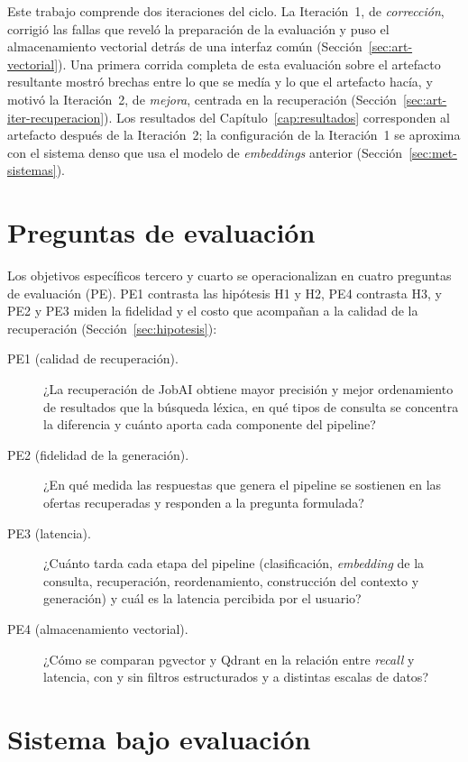 Este trabajo comprende dos iteraciones del ciclo. La Iteración~1, de \emph{corrección}, corrigió las fallas que reveló la preparación de la evaluación y puso el almacenamiento vectorial detrás de una interfaz común (Sección~\ref{sec:art-vectorial}). Una primera corrida completa de esta evaluación sobre el artefacto resultante mostró brechas entre lo que se medía y lo que el artefacto hacía, y motivó la Iteración~2, de \emph{mejora}, centrada en la recuperación (Sección~\ref{sec:art-iter-recuperacion}). Los resultados del Capítulo~\ref{cap:resultados} corresponden al artefacto después de la Iteración~2; la configuración de la Iteración~1 se aproxima con el sistema denso que usa el modelo de \textit{embeddings} anterior (Sección~\ref{sec:met-sistemas}).

\section{Preguntas de evaluación}
\label{sec:met-preguntas}

Los objetivos específicos tercero y cuarto se operacionalizan en cuatro preguntas de evaluación (PE). PE1 contrasta las hipótesis H1 y H2, PE4 contrasta H3, y PE2 y PE3 miden la fidelidad y el costo que acompañan a la calidad de la recuperación (Sección~\ref{sec:hipotesis}):

\begin{description}
    \item[PE1 (calidad de recuperación).] ¿La recuperación de JobAI obtiene mayor precisión y mejor ordenamiento de resultados que la búsqueda léxica, en qué tipos de consulta se concentra la diferencia y cuánto aporta cada componente del pipeline?
    \item[PE2 (fidelidad de la generación).] ¿En qué medida las respuestas que genera el pipeline se sostienen en las ofertas recuperadas y responden a la pregunta formulada?
    \item[PE3 (latencia).] ¿Cuánto tarda cada etapa del pipeline (clasificación, \textit{embedding} de la consulta, recuperación, reordenamiento, construcción del contexto y generación) y cuál es la latencia percibida por el usuario?
    \item[PE4 (almacenamiento vectorial).] ¿Cómo se comparan pgvector y Qdrant en la relación entre \textit{recall} y latencia, con y sin filtros estructurados y a distintas escalas de datos?
\end{description}

\section{Sistema bajo evaluación}
\label{sec:met-sistema}

